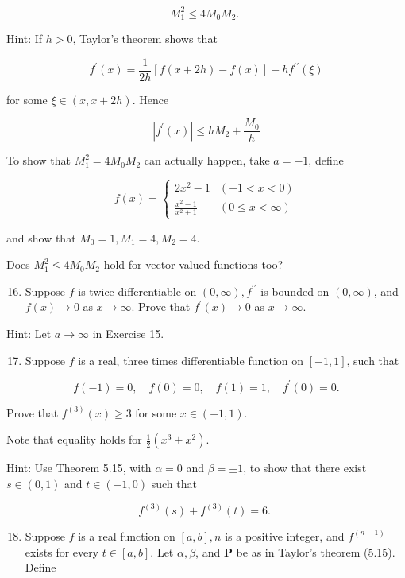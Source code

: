 \documentclass[10pt]{article}
\begin{document}
$$
M_{1}^{2} \leq 4 M_{0} M_{2} \text {. }
$$

Hint: If $h>0$, Taylor's theorem shows that

$$
f^{\prime}(x)=\frac{1}{2 h}[f(x+2 h)-f(x)]-h f^{\prime \prime}(\xi)
$$

for some $\xi \in(x, x+2 h)$. Hence

$$
\left|f^{\prime}(x)\right| \leq h M_{2}+\frac{M_{0}}{h}
$$

To show that $M_{1}^{2}=4 M_{0} M_{2}$ can actually happen, take $a=-1$, define

$$
f(x)= \begin{cases}2 x^{2}-1 & (-1<x<0) \\ \frac{x^{2}-1}{x^{2}+1} & (0 \leq x<\infty)\end{cases}
$$

and show that $M_{0}=1, M_{1}=4, M_{2}=4$.

Does $M_{1}^{2} \leq 4 M_{0} M_{2}$ hold for vector-valued functions too?

\begin{enumerate}
  \setcounter{enumi}{15}
  \item Suppose $f$ is twice-differentiable on $(0, \infty), f^{\prime \prime}$ is bounded on $(0, \infty)$, and $f(x) \rightarrow 0$ as $x \rightarrow \infty$. Prove that $f^{\prime}(x) \rightarrow 0$ as $x \rightarrow \infty$.
\end{enumerate}

Hint: Let $a \rightarrow \infty$ in Exercise 15.

\begin{enumerate}
  \setcounter{enumi}{16}
  \item Suppose $f$ is a real, three times differentiable function on $[-1,1]$, such that
\end{enumerate}

$$
f(-1)=0, \quad f(0)=0, \quad f(1)=1, \quad f^{\prime}(0)=0 .
$$

Prove that $f^{(3)}(x) \geq 3$ for some $x \in(-1,1)$.

Note that equality holds for $\frac{1}{2}\left(x^{3}+x^{2}\right)$.

Hint: Use Theorem 5.15, with $\alpha=0$ and $\beta= \pm 1$, to show that there exist $s \in(0,1)$ and $t \in(-1,0)$ such that

$$
f^{(3)}(s)+f^{(3)}(t)=6 \text {. }
$$

\begin{enumerate}
  \setcounter{enumi}{17}
  \item Suppose $f$ is a real function on $[a, b], n$ is a positive integer, and $f^{(n-1)}$ exists for every $t \in[a, b]$. Let $\alpha, \beta$, and $\boldsymbol{P}$ be as in Taylor's theorem (5.15). Define
\end{enumerate}
\end{document}
